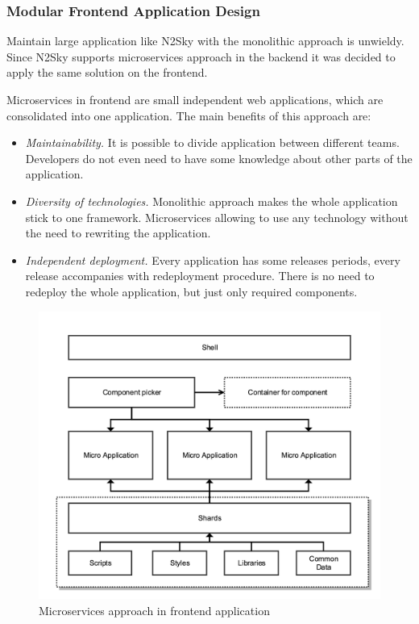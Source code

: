  
 
\subsubsection{Modular Frontend Application Design}\label{Modular frontend application design}

Maintain large application like N2Sky with the monolithic approach is unwieldy. Since N2Sky supports microservices approach in the backend it was decided to apply the same solution on the frontend.  

Microservices in frontend are small independent web applications, which are consolidated into one application. The main benefits of this approach are:

\begin{itemize}
\item \emph{Maintainability.} It is possible to divide application between different teams. Developers do not even need to have some knowledge about other parts of the application. 
\item \emph{Diversity of technologies.} Monolithic approach makes the whole application stick to one framework. Microservices allowing to use any technology without the need to rewriting the application.
\item \emph{Independent deployment.} Every application has some releases periods, every release accompanies with redeployment procedure. There is no need to redeploy the whole application, but just only required components.
\end{itemize}


\begin{figure}[H]
\begin{center}
  \includegraphics[width=\linewidth]{components/2/frontend_arch.png}
  \caption{Microservices approach in frontend application}
  \label{fig:frontend_arch}
\end{center}
\end{figure}


